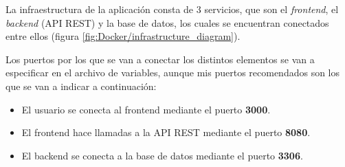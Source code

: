 La infraestructura de la aplicación consta de 3 servicios, que son el \textit{frontend}, el \textit{backend} (API REST) y la base de datos, los cuales se encuentran conectados entre ellos (figura \ref{fig:Docker/infrastructure_diagram}). 

Los puertos por los que se van a conectar los distintos elementos se van a especificar en el archivo de variables, aunque mis puertos recomendados son los que se van a indicar a continuación:

\begin{itemize}
	\item El usuario se conecta al frontend mediante el puerto \textbf{3000}.
	\item El frontend hace llamadas a la API REST mediante el puerto \textbf{8080}.
	\item El backend se conecta a la base de datos mediante el puerto \textbf{3306}.	
\end{itemize}


